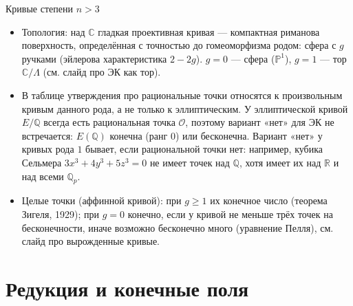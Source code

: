 \documentclass[serif, aspectratio=169]{beamer}
\begin{document}
\begin{frame}{Кривые степени $n>3$}
{\begin{itemize}
            \item Топология: над $\mathbb{C}$ гладкая проективная кривая --- компактная риманова поверхность, определённая с точностью до гомеоморфизма родом: сфера с $g$ ручками (эйлерова характеристика $2-2g$). $g=0$ --- сфера ($\mathbb{P}^1$), $g=1$ --- тор $\mathbb{C}/\Lambda$ (см. слайд про ЭК как тор).
            \item В таблице утверждения про рациональные точки относятся к произвольным кривым данного рода, а не только к эллиптическим. У эллиптической кривой $E/\mathbb{Q}$ всегда есть рациональная точка $\mathcal{O}$, поэтому вариант «нет» для ЭК не встречается: $E(\mathbb{Q})$ конечна (ранг $0$) или бесконечна. Вариант «нет» у кривых рода $1$ бывает, если рациональной точки нет: например, кубика Сельмера $3x^3+4y^3+5z^3=0$ не имеет точек над $\mathbb{Q}$, хотя имеет их над $\mathbb{R}$ и над всеми $\mathbb{Q}_p$.
            \item Целые точки (аффинной кривой): при $g\ge1$ их конечное число (теорема Зигеля, 1929); при $g=0$ конечно, если у кривой не меньше трёх точек на бесконечности, иначе возможно бесконечно много (уравнение Пелля), см. слайд про вырожденные кривые.
        \end{itemize}
    }
\end{frame}

\section{Редукция и конечные поля}
\end{document}
